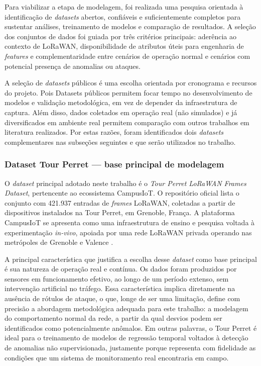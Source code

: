 Para viabilizar a etapa de modelagem, foi realizada uma pesquisa orientada 
à identificação de \textit{datasets} abertos, confiáveis e suficientemente 
completos para sustentar análises, treinamento de modelos e comparação de 
resultados. A seleção dos conjuntos de dados foi guiada por três critérios 
principais: aderência ao contexto de LoRaWAN, disponibilidade de atributos 
úteis para engenharia de \textit{features} e complementaridade entre cenários 
de operação normal e cenários com potencial presença de anomalias ou ataques.

A seleção de \textit{datasets} públicos é uma escolha orientada 
por cronograma e recursos do projeto. Pois Datasets públicos permitem focar tempo no desenvolvimento de modelos e validação 
metodológica, em vez de depender da  infraestrutura de captura. Além disso, dados 
coletados em operação real (não simulados) e já diversificados em ambiente 
real permitem comparação com outros trabalhos em literatura realizados. Por estas 
razões, foram identificados dois \textit{datasets} complementares nas 
subseções seguintes e que serão utilizados no trabalho.


\subsubsection{Dataset Tour Perret — base principal de modelagem}

O \textit{dataset} principal adotado neste trabalho é o \textit{Tour Perret 
LoRaWAN Frames Dataset}, pertencente ao ecossistema CampusIoT. O repositório 
oficial lista o conjunto com 421.937 entradas de \textit{frames} LoRaWAN, 
coletadas a partir de dispositivos instalados na Tour Perret, em Grenoble, 
França. A plataforma CampusIoT se apresenta como uma infraestrutura de ensino 
e pesquisa voltada à experimentação \textit{in-vivo}, apoiada por uma rede 
LoRaWAN privada operando nas metrópoles de Grenoble e Valence 
\cite{campusiot_platform, tourperret_dataset}.

A principal característica que justifica a escolha desse \textit{dataset} 
como base principal é sua natureza de operação real e contínua. Os dados 
foram produzidos por sensores em funcionamento efetivo, ao longo de um 
período extenso, sem intervenção artificial no tráfego. Essa característica 
implica diretamente na ausência de rótulos de ataque, o que, longe de ser 
uma limitação, define com precisão a abordagem metodológica adequada para 
este trabalho: a modelagem do comportamento normal da rede, a partir da qual 
desvios podem ser identificados como potencialmente anômalos. Em outras 
palavras, o Tour Perret é ideal para o treinamento de modelos de regressão 
temporal voltados à detecção de anomalias não supervisionada, justamente 
porque representa com fidelidade as condições que um sistema de monitoramento 
real encontraria em campo.

